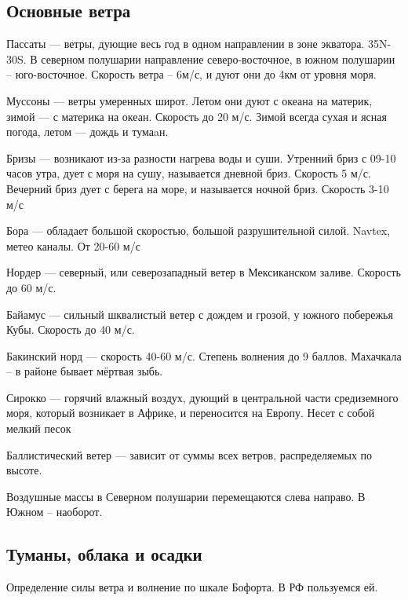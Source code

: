\documentclass{article}        %
\begin{document}
\subsection{Основные ветра}
\begin{definition}
\item{ Пассаты } --- ветры, дующие весь год в одном направлении в зоне экватора. 35\degree N-30\degree S. В северном полушарии направление северо-восточное, в южном полушарии -- юго-восточное.
Скорость ветра -- 6м/с, и дуют они до 4км от уровня моря.

\item{Муссоны} --- ветры умеренных широт. Летом они дуют с океана на материк, зимой --- с материка на океан. Скорость до 20 м/с. Зимой всегда сухая и ясная погода, летом --- дождь и тумаaн.

\item{Бризы} --- возникают из-за разности нагрева воды и суши. Утренний бриз с 09-10 часов утра, дует с моря на сушу, называется дневной бриз. Скорость 5 м/с. Вечерний бриз дует с берега на море, и называется ночной бриз. Скорость 3-10 м/с

\item{Бора} --- обладает большой скоростью, большой разрушительной силой.
Navtex, метео каналы. От 20-60 м/с 

\item{Нордер} --- северный, или северозападный ветер в Мексиканском заливе. Скорость до 60 м/с.

\item{Байамус} --- сильный шквалистый ветер с дождем и грозой, у южного побережья Кубы.
	Скорость до 40 м/с. 

\item{Бакинский норд} --- скорость 40-60 м/с. Степень волнения до 9 баллов. Махачкала -- в районе бывает мёртвая зыбь.

\item{Сирокко} --- горячий влажный воздух, дующий в центральной части средиземного моря, 
который возникает в Африке, и переносится на Европу. Несет с собой мелкий песок

\item{Баллистический ветер} --- зависит от суммы всех ветров, распределяемых по высоте.
\end{definition}

Воздушные массы в Северном полушарии перемещаются слева направо.
В Южном -- наоборот.

\subsection{Туманы, облака и осадки}
Определение силы ветра и волнение по шкале Бофорта. В РФ пользуемся ей.
\end{document}
